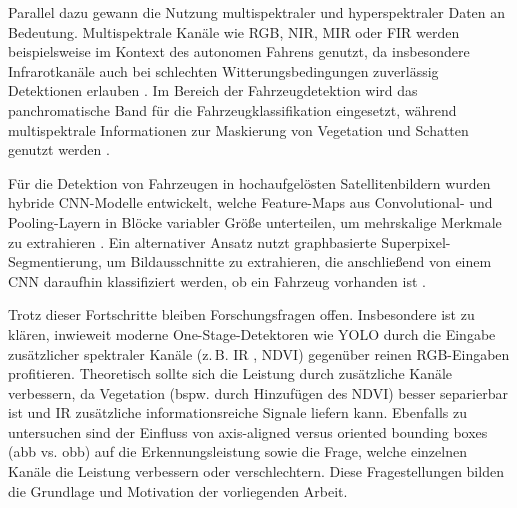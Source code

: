 Parallel dazu gewann die Nutzung multispektraler und hyperspektraler Daten an Bedeutung. Multispektrale Kanäle wie \acrshort{RGB}, \acrshort{NIR}, \Acrfull{MIR} oder \Acrfull{FIR} werden beispielsweise im Kontext des autonomen Fahrens genutzt, da insbesondere Infrarotkanäle auch bei schlechten Witterungsbedingungen zuverlässig Detektionen erlauben \cite{Takumi2017}. Im Bereich der Fahrzeugdetektion wird das panchromatische Band für die Fahrzeugklassifikation eingesetzt, während multispektrale Informationen zur Maskierung von Vegetation und Schatten genutzt werden \cite{Eikvil2009}.

Für die Detektion von Fahrzeugen in hochaufgelösten Satellitenbildern wurden hybride \acrshort{CNN}-Modelle entwickelt, welche Feature-Maps aus Convolutional- und Pooling-Layern in Blöcke variabler Größe unterteilen, um mehrskalige Merkmale zu extrahieren \cite{XueyunChen2014}. Ein alternativer Ansatz nutzt graphbasierte Superpixel-Segmentierung, um Bildausschnitte zu extrahieren, die anschließend von einem \acrshort{CNN} daraufhin klassifiziert werden, ob ein Fahrzeug vorhanden ist \cite{Jiang2015}.

Trotz dieser Fortschritte bleiben Forschungsfragen offen. Insbesondere ist zu klären, inwieweit moderne One-Stage-Detektoren wie \acrshort{YOLO} durch die Eingabe zusätzlicher spektraler Kanäle (z.\,B. \Acrfull{IR} , \acrshort{NDVI}) gegenüber reinen \acrshort{RGB}-Eingaben profitieren. Theoretisch sollte sich die Leistung durch zusätzliche Kanäle verbessern, da Vegetation (bspw. durch Hinzufügen des \acrshort{NDVI}) besser separierbar ist und \acrshort{IR} zusätzliche informationsreiche Signale liefern kann. Ebenfalls zu untersuchen sind der Einfluss von axis-aligned versus oriented bounding boxes (\acrshort{abb} vs. \acrshort{obb}) auf die Erkennungsleistung sowie die Frage, welche einzelnen Kanäle die Leistung verbessern oder verschlechtern. Diese Fragestellungen bilden die Grundlage und Motivation der vorliegenden Arbeit.




